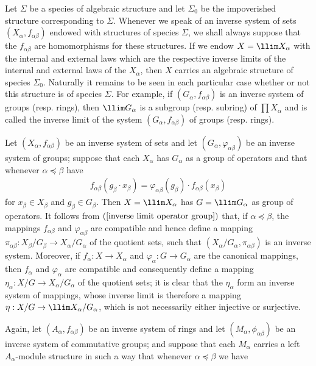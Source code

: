 Let $\Sigma$ be a species of algebraic structure and let $\Sigma_0$ be the impoverished structure corresponding to $\Sigma$. Whenever we speak of an inverse system of sets $(X_{\alpha},f_{\alpha\beta})$ endowed with structures of species $\Sigma$, we shall always suppose that the $f_{\alpha\beta}$ are homomorphisms for these structures. If we endow $X=\llim X_\alpha$ with the internal and external laws which are the respective inverse limits of the internal and external laws of the $X_\alpha$, then $X$ carries an algebraic structure of species $\Sigma_0$. Naturally it remains to be seen in each particular case whether or not this structure is of species $\Sigma$. For example, if $(G_\alpha,f_{\alpha\beta})$ is an inverse system of groups (resp. rings), then $\llim G_\alpha$ is a subgroup (resp. subring) of $\prod X_\alpha$ and is called the inverse limit of the system $(G_\alpha,f_{\alpha\beta})$ of groups (resp. rings).\par
Let $(X_\alpha,f_{\alpha\beta})$ be an inverse system of sets and let $(G_\alpha,\varphi_{\alpha\beta})$ be an inverse system of groups; suppose that each $X_\alpha$ has $G_\alpha$ as a group of operators and that whenever $\alpha\preceq\beta$ have
\begin{align}\label{inverse limit operator group}
f_{\alpha\beta}(g_\beta\cdot x_\beta)=\varphi_{\alpha\beta}(g_\beta)\cdot f_{\alpha\beta}(x_\beta)
\end{align}
for $x_\beta\in X_\beta$ and $g_\beta\in G_\beta$. Then $X=\llim X_\alpha$ has $G=\llim G_\alpha$ as group of operators. It follows from $(\ref{inverse limit operator group})$ that, if $\alpha\preceq\beta$, the mappings $f_{\alpha\beta}$ and $\varphi_{\alpha\beta}$ are compatible and hence define a mapping $\pi_{\alpha\beta}:X_\beta/G_\beta\to X_\alpha/G_\alpha$ of the quotient sets, such that $(X_{\alpha}/G_\alpha,\pi_{\alpha\beta})$ is an inverse system. Moreover, if $f_\alpha:X\to X_\alpha$ and $\varphi_\alpha:G\to G_\alpha$ are the canonical mappings, then $f_\alpha$ and $\varphi_\alpha$ are compatible and consequently define a mapping $\eta_\alpha:X/G\to X_\alpha/G_\alpha$ of the quotient sets; it is clear that the $\eta_\alpha$ form an inverse system of mappings, whose inverse limit is therefore a mapping $\eta:X/G\to\llim X_\alpha/G_\alpha$, which is not necessarily either injective or surjective.\par
Again, let $(A_\alpha,f_{\alpha\beta})$ be an inverse system of rings and let $(M_\alpha,\phi_{\alpha\beta})$ be an inverse system of commutative groups; and suppose that each $M_\alpha$ carries a left $A_\alpha$-module structure in such a way that whenever $\alpha\preceq\beta$ we have
